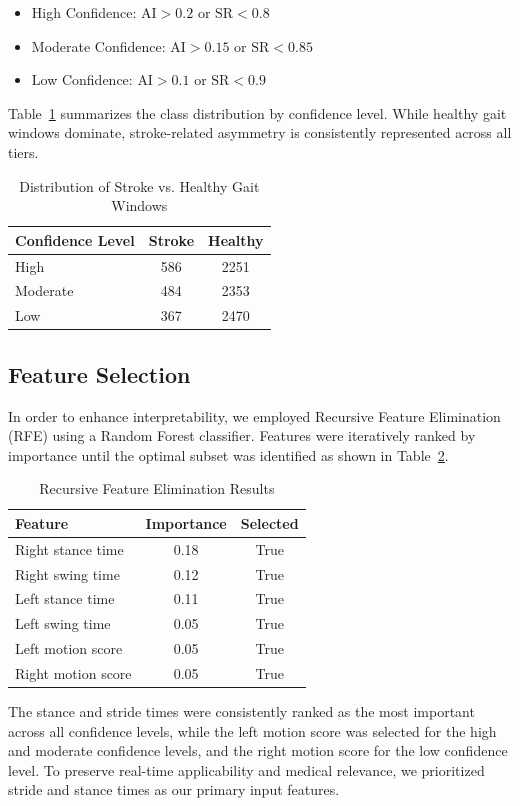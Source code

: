 \begin{itemize}
    \item High Confidence: $\text{AI} > 0.2$ or $\text{SR} < 0.8$
    \item Moderate Confidence: $\text{AI} > 0.15$ or $\text{SR} < 0.85$
    \item Low Confidence: $\text{AI} > 0.1$ or $\text{SR} < 0.9$
\end{itemize}

Table~\ref{tab:confidence_distribution} summarizes the class distribution by confidence level. While healthy gait windows dominate, stroke-related asymmetry 
is consistently represented across all tiers.

\begin{table}[h]
    \centering
    \caption{Distribution of Stroke vs. Healthy Gait Windows}
    \label{tab:confidence_distribution}
    \begin{tabular}{lcc}
        \toprule
        \textbf{Confidence Level} & \textbf{Stroke} & \textbf{Healthy} \\
        \midrule
        High     & 586 & 2251 \\
        Moderate & 484 & 2353 \\
        Low      & 367 & 2470 \\
        \bottomrule
    \end{tabular}
\end{table}

\subsection{Feature Selection}
In order to enhance interpretability, we employed Recursive Feature Elimination (RFE) using a Random Forest classifier. Features were 
iteratively ranked by importance until the optimal subset was identified as shown in Table~\ref{tab:rfe}.

\begin{table}[!h]
\centering
\caption{Recursive Feature Elimination Results}
\label{tab:rfe}
    \begin{tabular}{lcc}
    \toprule
    \textbf{Feature} & \textbf{Importance} & \textbf{Selected} \\
    \midrule
        Right stance time   & 0.18 & True \\
        Right swing time    & 0.12 & True \\
        Left stance time    & 0.11 & True \\
        Left swing time     & 0.05 & True \\
        Left motion score   & 0.05 & True \\
        Right motion score  & 0.05 & True \\
    \bottomrule
    \end{tabular}
\end{table}

The stance and stride times were consistently ranked as the most important across all confidence levels, while the left motion score was selected for the high 
and moderate confidence levels, and the right motion score for the low confidence level. To preserve real-time applicability and medical relevance, we prioritized 
stride and stance times as our primary input features.

